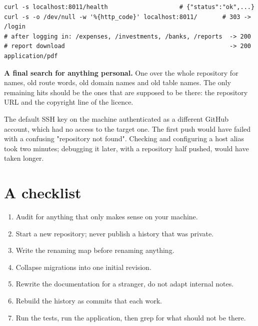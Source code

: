 \begin{lstlisting}[style=sh]
curl -s localhost:8011/health                    # {"status":"ok",...}
curl -s -o /dev/null -w '%{http_code}' localhost:8011/       # 303 -> /login
# after logging in: /expenses, /investments, /banks, /reports  -> 200
# report download                                              -> 200 application/pdf
\end{lstlisting}

\textbf{A final search for anything personal.} One  over the whole
repository for names, old route words, old domain names and old table names. The
only remaining hits should be the ones that are supposed to be there: the
repository URL and the copyright line of the licence.

\begin{pitfall}
The default SSH key on the machine authenticated as a different GitHub account,
which had no access to the target one. The first push would have failed with a
confusing "repository not found". Checking  and configuring a host
alias took two minutes; debugging it later, with a repository half pushed, would
have taken longer.
\end{pitfall}

\section{A checklist}

\begin{enumerate}
  \item Audit for anything that only makes sense on your machine.
  \item Start a new repository; never publish a history that was private.
  \item Write the renaming map before renaming anything.
  \item Collapse migrations into one initial revision.
  \item Rewrite the documentation for a stranger, do not adapt internal notes.
  \item Rebuild the history as commits that each work.
  \item Run the tests, run the application, then grep for what should not be
        there.
\end{enumerate}
